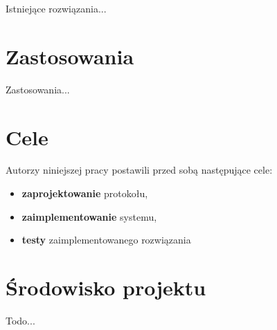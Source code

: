 \documentclass[praca_magisterska]{subfiles}
\begin{document}
Istniejące rozwiązania...

\section{Zastosowania}

Zastosowania...

\section{Cele}

\noindent Autorzy niniejszej pracy postawili przed sobą następujące cele:
\begin{itemize}
	\item \textbf{zaprojektowanie} protokołu,
	\item \textbf{zaimplementowanie} systemu,
	\item \textbf{testy} zaimplementowanego rozwiązania
\end{itemize}

\newpage

\section{Środowisko projektu}

Todo...
\newpage
\end{document}
